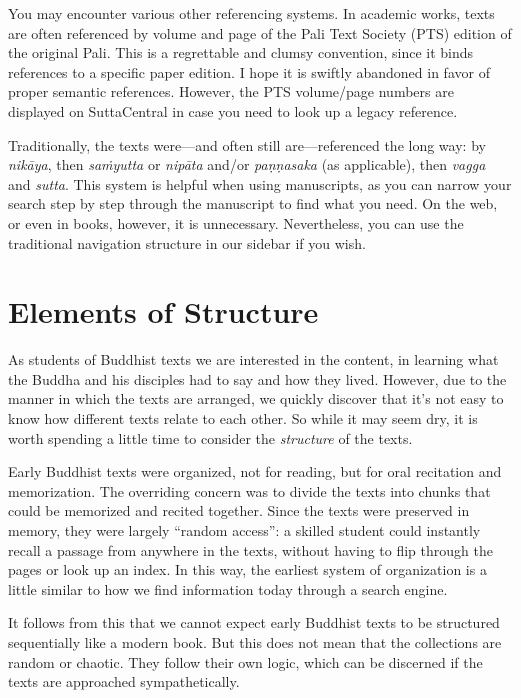 \documentclass[12pt,openany]{book}%
\begin{document}
You may encounter various other referencing systems. In academic works, texts are often referenced by volume and page of the Pali Text Society (PTS) edition of the original Pali. This is a regrettable and clumsy convention, since it binds references to a specific paper edition. I hope it is swiftly abandoned in favor of proper semantic references. However, the PTS volume/page numbers are displayed on SuttaCentral in case you need to look up a legacy reference.

Traditionally, the texts were—and often still are—referenced the long way: by \textit{\textsanskrit{nikāya}}, then \textit{\textsanskrit{saṁyutta}} or \textit{\textsanskrit{nipāta}} and/or \textit{\textsanskrit{paṇṇasaka}} (as applicable), then \textit{vagga} and \textit{sutta}. This system is helpful when using manuscripts, as you can narrow your search step by step through the manuscript to find what you need. On the web, or even in books, however, it is unnecessary. Nevertheless, you can use the traditional navigation structure in our sidebar if you wish.

\section*{Elements of Structure}

As students of Buddhist texts we are interested in the content, in learning what the Buddha and his disciples had to say and how they lived. However, due to the manner in which the texts are arranged, we quickly discover that it’s not easy to know how different texts relate to each other. So while it may seem dry, it is worth spending a little time to consider the \emph{structure} of the texts.

Early Buddhist texts were organized, not for reading, but for oral recitation and memorization. The overriding concern was to divide the texts into chunks that could be memorized and recited together. Since the texts were preserved in memory, they were largely “random access”: a skilled student could instantly recall a passage from anywhere in the texts, without having to flip through the pages or look up an index. In this way, the earliest system of organization is a little similar to how we find information today through a search engine.

It follows from this that we cannot expect early Buddhist texts to be structured sequentially like a modern book. But this does not mean that the collections are random or chaotic. They follow their own logic, which can be discerned if the texts are approached sympathetically.
\end{document}
